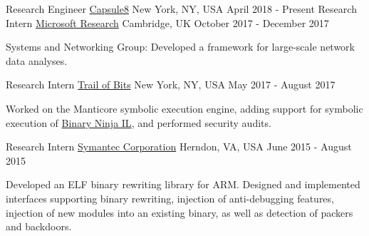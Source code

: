 

\begin{cventries}

  \cventry
    {Research Engineer}
		{\href{https://capsule8.com/}{Capsule8}} %
    {New York, NY, USA}
    {April 2018 - Present}
    {
    }
\vspace{0.1in}
  \cventry
    {Research Intern}
		{\href{https://www.microsoft.com/en-us/research/lab/microsoft-research-cambridge/}{Microsoft Research}} %
    {Cambridge, UK}
    {October 2017 - December 2017}
    {
      \begin{cvitems} %
      \item {Systems and Networking Group: Developed a framework for
          large-scale network data analyses.}
      \end{cvitems}
    }

\vspace{0.1in}

\cventry
    {Research Intern} %
		{\href{May 2017 - August 2017}{Trail of Bits}} %
    {New York, NY, USA}
    {May 2017 - August 2017}
    {
      \begin{cvitems} %
      \item {Worked on the Manticore symbolic execution engine, adding support
          for symbolic execution of \href{https://binary.ninja/}{Binary Ninja IL}, and performed security audits.}
      \end{cvitems}
    }

\vspace{0.1in}

  \cventry
    {Research Intern} %
		{\href{May 2015 - August 2015}{Symantec Corporation}} %
    {Herndon, VA, USA}
    {June 2015 - August 2015}
    {
      \begin{cvitems} %
        \item {Developed an ELF binary rewriting library for ARM. Designed and
            implemented interfaces supporting binary rewriting, injection of
              anti-debugging features, injection of new modules into an existing
              binary, as well as detection of packers and backdoors.}
      \end{cvitems}
    }



\end{cventries}
